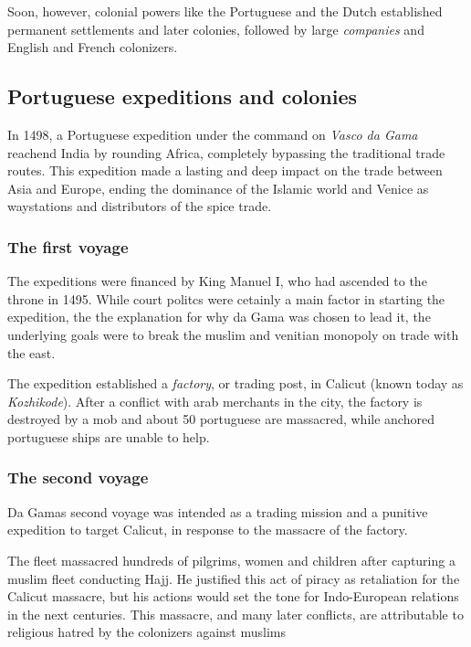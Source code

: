 \documentclass[11pt, a4paper, headings=standardclasses]{scrartcl}
\begin{document}
Soon, however, colonial powers like the Portuguese and the Dutch established permanent settlements and later colonies, followed by large \emph{companies} and English and French colonizers.

\subsection{Portuguese expeditions and colonies}

In 1498, a Portuguese expedition under the command on \emph{Vasco da Gama} reachend India by rounding Africa, completely bypassing the traditional trade routes\autocite{VdG}. This expedition made a lasting and deep impact on the trade between Asia and Europe, ending the dominance of the Islamic world and Venice as waystations and distributors of the spice trade.\autocite{GLO}

\subsubsection{The first voyage}

The expeditions were financed by King Manuel I, who had ascended to the throne in 1495. While court politcs were cetainly a main factor in starting the expedition, the the explanation for why da Gama was chosen to lead it, the underlying goals were to break the muslim and venitian monopoly on trade with the east.\autocite{Vasco}

The expedition established a \emph{factory}, or trading post, in Calicut (known today as \textit{Kozhikode}). After a conflict with arab merchants in the city, the factory is destroyed by a mob and  about 50 portuguese are massacred, while anchored portuguese ships are unable to help.\autocite{1550}

\subsubsection{The second voyage}

Da Gamas second voyage was intended as a trading mission and a punitive expedition to target Calicut, in response to the massacre of the factory.\autocite{Vasco}

The fleet massacred hundreds of pilgrims, women and children after capturing a muslim fleet conducting Hajj. He justified this act of piracy as retaliation for the Calicut massacre,\autocite{1550} but his actions would set the tone for Indo-European relations in the next centuries. This massacre, and many later conflicts, are attributable to religious hatred by the colonizers against muslims\autocite[382]{FT}
\end{document}
